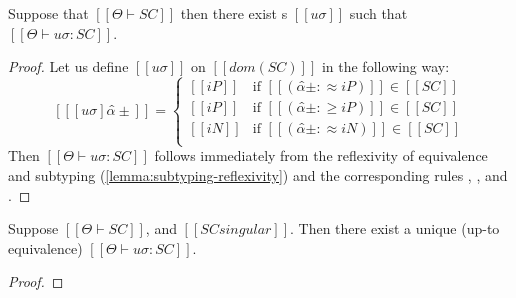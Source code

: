 \begin{lemma}
    \label{lemma:constraint-sat}
    Suppose that $[[Θ ⊢ SC]]$ then there exist
    s $[[uσ]]$ such that $[[Θ ⊢ uσ : SC]]$.
\end{lemma}
\begin{proof}
    Let us define $[[uσ]]$
    on $[[dom(SC)]]$ in the following way: 
    $$
    [[ [uσ]α̂± ]] = 
    \begin{cases}
        [[iP]] & \text{if $[[(α̂± :≈ iP)]] \in [[SC]]$} \\
        [[iP]] & \text{if $[[(α̂± :≥ iP)]] \in [[SC]]$} \\
        [[iN]] & \text{if $[[(α̂± :≈ iN)]] \in [[SC]]$} \\
    \end{cases}
    $$
    Then $[[Θ ⊢ uσ : SC]]$ follows immediately
    from the reflexivity of equivalence and subtyping
    (\cref{lemma:subtyping-reflexivity}) and the corresponding
    rules 
    , 
    ,
    and .
\end{proof}

\begin{lemma}
    Suppose $[[Θ ⊢ SC]]$,
    and $[[SC singular]]$. 
    Then there exist a unique (up-to equivalence)
    $[[Θ ⊢ uσ : SC]]$.
\end{lemma}
\begin{proof}

\end{proof}